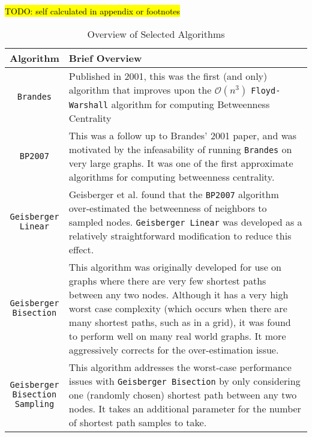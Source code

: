\documentclass[12pt,a4paper,twoside,openright]{report}
\makeatletter
\newcommand{\todo}[1]{\hl{TODO: #1}}
\newcommand{\ttt}[1]{\texttt{#1}}
\newcommand{\specialcell}[2][c]{%
	\begin{tabular}[#1]{@{}c@{}}#2\end{tabular}} %
\newcommand{\bigO}[1]{$\mathcal{O}(#1)$}
\makeatother
\begin{document}
	\begin{table}[H]
		\label{tab:algorithms}
		\renewcommand\arraystretch{1.5}
		\centering
		\caption{Overview of Selected Algorithms} \todo{self calculated in appendix or footnotes}
		\begin{tabularx}{\textwidth}{|c|X|}
			\hline
			\textbf{Algorithm} &
			\textbf{Brief Overview} \\ 
			\hline
			
			\ttt{Brandes} \cite{brandes} &
			
			Published in 2001, this was the first (and only) algorithm that improves upon the \bigO{n^3} \ttt{Floyd-Warshall} algorithm for computing Betweenness Centrality \\ 
			\hline
			
			\ttt{BP2007} \cite{brandes2007} &
			
			This was a follow up to Brandes' 2001 paper, and was motivated by the infeasability of running \ttt{Brandes} on very large graphs. It was one of the first approximate algorithms for computing betweenness centrality. \\ 
			\hline
			
			\specialcell[t]{\ttt{Geisberger}\\ \ttt{Linear}\cite{geisberger}} &
			
			Geisberger et al. found that the \ttt{BP2007} algorithm over-estimated the betweenness of neighbors to sampled nodes. \ttt{Geisberger Linear} was developed as a relatively straightforward modification to reduce this effect.\\
			\hline
			
			\specialcell[t]{\ttt{Geisberger}\\ \ttt{Bisection}\cite{geisberger}} &
			
			This algorithm was originally developed for use on graphs where there are very few shortest paths between any two nodes. Although it has a very high worst case complexity (which occurs when there are many shortest paths, such as in a grid), it was found to perform well on many real world graphs. It more aggressively corrects for the over-estimation issue. \\ 
			\hline
			
			\specialcell[t]{\ttt{Geisberger}\\ \ttt{Bisection}\\ \ttt{Sampling} \cite{geisberger}} &
			
			This algorithm addresses the worst-case performance issues with \ttt{Geisberger Bisection} by only considering one (randomly chosen) shortest path between any two nodes. It takes an additional parameter for the number of shortest path samples to take. \\ 
			\hline
			

\end{tabularx}
\end{table}
\end{document}

